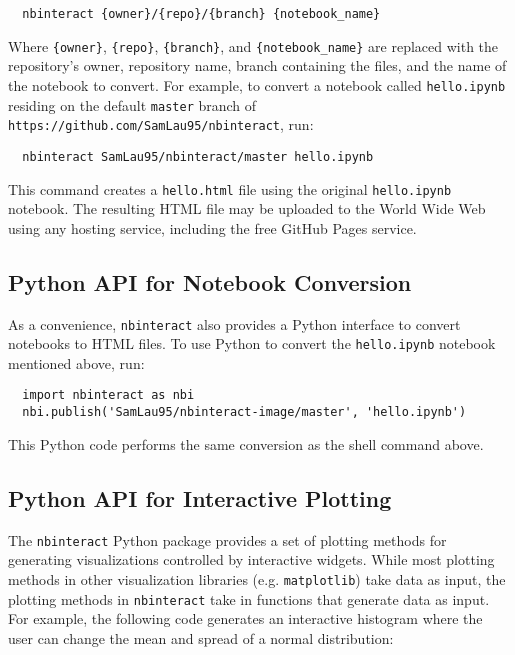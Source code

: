 \documentclass[nobib]{tufte-handout}
\newcommand{\code}[1]{\texttt{#1}}
\begin{document}
\begin{verbatim}
  nbinteract {owner}/{repo}/{branch} {notebook_name}
\end{verbatim}

Where \code{\{owner\}}, \code{\{repo\}}, \code{\{branch\}}, and
\verb|{notebook_name}| are replaced with the repository's owner, repository
name, branch containing the files, and the name of the notebook to convert. For
example, to convert a notebook called \code{hello.ipynb} residing on the
default \code{master} branch of \code{https://github.com/SamLau95/nbinteract},
run:

\begin{verbatim}
  nbinteract SamLau95/nbinteract/master hello.ipynb
\end{verbatim}

This command creates a \code{hello.html} file using the original
\code{hello.ipynb} notebook. The resulting HTML file may be
uploaded to the World Wide Web using any hosting service, including the free
GitHub Pages service.


\subsection{Python API for Notebook Conversion} %
\label{sub:python_api}

As a convenience, \code{nbinteract} also provides a Python interface to convert
notebooks to HTML files. To use Python to convert the \code{hello.ipynb}
notebook mentioned above, run:

\begin{verbatim}
  import nbinteract as nbi
  nbi.publish('SamLau95/nbinteract-image/master', 'hello.ipynb')
\end{verbatim}

This Python code performs the same conversion as the shell command above.


\subsection{Python API for Interactive Plotting} %
\label{sub:python_api_for_interactive_plotting}

The \code{nbinteract} Python package provides a set of plotting methods for
generating visualizations controlled by interactive widgets. While most
plotting methods in other visualization libraries (e.g. \code{matplotlib}) take
data as input, the plotting methods in \code{nbinteract} take in functions that
generate data as input. For example, the following code generates an
interactive histogram where the user can change the mean and spread of a normal
distribution:
\end{document}
